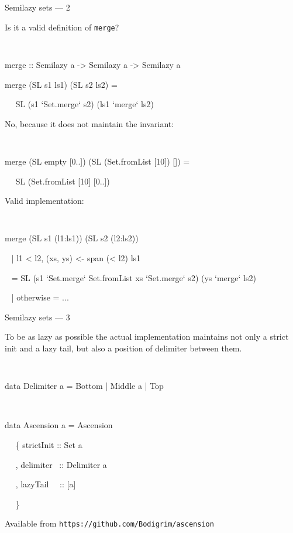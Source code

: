 \documentclass[handout]{beamer}
\begin{document}
\begin{frame}{Semilazy sets --- 2}

Is it a valid definition of {\tt merge}?

\bigskip

{\tt
\par merge :: Semilazy a -> Semilazy a -> Semilazy a
\par merge (SL s1 ls1) (SL s2 ls2) =
\par ~~  SL (s1 `Set.merge` s2) (ls1 `merge` ls2)
}

\bigskip

\pause
No, because it does not maintain the invariant:

\bigskip

{\tt
\par merge (SL empty [0..]) (SL (Set.fromList [10]) []) =
\par ~~ SL (Set.fromList [10] [0..])
}

\bigskip

\pause
Valid implementation:

\bigskip

{\tt
\par merge (SL s1 (l1:ls1)) (SL s2 (l2:ls2))
\par ~  | l1 < l2, (xs, ys) <- span (< l2) ls1
\par ~  = SL (s1 `Set.merge` Set.fromList xs `Set.merge` s2) (ys `merge` ls2)
\par ~  | otherwise = ...
}

\end{frame}

\begin{frame}{Semilazy sets --- 3}

To be as lazy as possible
the actual implementation maintains not only a strict init
and a lazy tail, but also a position of delimiter between them.

\bigskip

{\tt
\par data Delimiter a = Bottom | Middle a | Top
\par ~
\par data Ascension a = Ascension
\par ~~  \{ strictInit :: Set a
\par ~~  ,  delimiter~ :: Delimiter a
\par ~~  ,  lazyTail~~ :: [a]
\par ~~  \}
}

\bigskip

\pause
Available from {\tt https://github.com/Bodigrim/ascension}

\end{frame}
\end{document}
